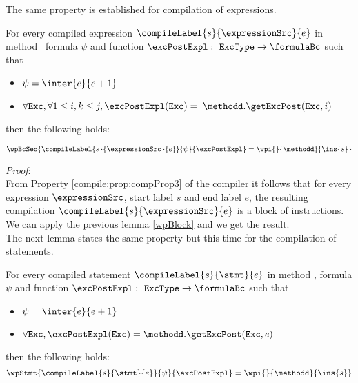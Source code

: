 The same property is established for compilation of expressions. 
\begin{relWpExpr}\label{relWpExpr}
     For every compiled expression $\compileLabel{s}{\expressionSrc}{e}$  in  method \methodd  \,  formula $\psi$ and function $\excPostExpl : \mbox{ \rm \texttt{ExcType}}  \rightarrow \formulaBc $ such that 

      \begin{itemize}
            \item $\psi = \inter{e}{e+1}$ 
	    \item $\forall \mbox{\rm\texttt{Exc}} ,  \forall 1 \le i,k \le j,  \excPostExpl( \mbox{\rm\texttt{Exc}} ) =$ 
                  $ \methodd.\getExcPost(\mbox{\rm\texttt{Exc}}, i ) $ 
            

      \end{itemize} then the following holds:

     $$   \wpBcSeq{\compileLabel{s}{\expressionSrc}{e}   }{\psi }{\excPostExpl} = \wpi{}{\methodd}{\ins{s}}$$        

\end{relWpExpr}

\textit{Proof}: \\
From Property \ref{compile:prop:compProp3} of the compiler it follows that for every expression
 $\expressionSrc$, start label $s$  and  end label $e$,
  the resulting compilation   $\compileLabel{s}{\expressionSrc}{e}$ is a block of instructions. We can apply 
 the previous lemma  \ref{wpBlock} and we get the result.
\Qed \\

The next lemma states the same property but this time for the compilation of statements.
\begin{relWpStmt}\label{relWpStmt}
     For every compiled statement $\compileLabel{s}{\stmt}{e}$  in  method \methodd, formula $\psi$ and 
    function $\excPostExpl : \mbox{ \rm \texttt{ExcType}}  \rightarrow \formulaBc $ such that 

      \begin{itemize}
            \item $\psi = \inter{e}{e+1}$
	    \item $\forall \mbox{\rm\texttt{Exc}} ,  \excPostExpl( \mbox{\rm\texttt{Exc}} ) = \methodd.\getExcPost(\mbox{\rm\texttt{Exc}}, e ) $ 
      \end{itemize} then the following holds: 
     $$   \wpStmt{\compileLabel{s}{\stmt}{e} }{\psi }{\excPostExpl} = \wpi{}{\methodd}{\ins{s}}$$   
\end{relWpStmt}

